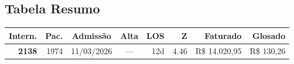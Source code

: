 \documentclass[a4paper,10pt]{article}
\begin{document}
\subsection{Tabela Resumo}
\begin{center}
\begin{longtable}{>{\scriptsize}r>{\scriptsize}r>{\scriptsize}c>{\scriptsize}c>{\scriptsize}r>{\scriptsize}r>{\scriptsize}r>{\scriptsize}r}
\toprule
\textbf{Intern.} & \textbf{Pac.} & \textbf{Admiss\~{a}o} & \textbf{Alta} & \textbf{LOS} & \textbf{Z} & \textbf{Faturado} & \textbf{Glosado} \\
\midrule
\endhead
\bottomrule
\endfoot

\textcolor{anomorange}{\textbf{2138}} & 1974 & 11/03/2026 & — & 12d & \textcolor{anomorange}{4.46} & R\$ 14.020,95 & \textcolor{anomred}{R\$ 130,26} \\

\end{longtable}\end{center}
\end{document}
